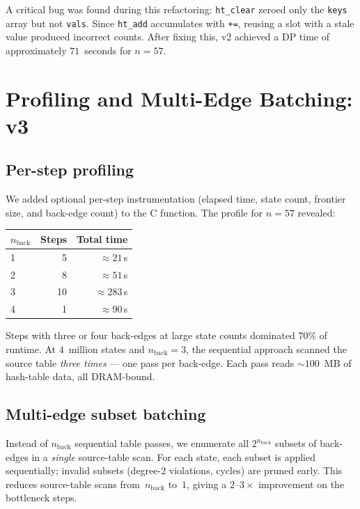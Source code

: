 \documentclass[12pt]{article}
\theoremstyle{definition}
\newcommand{\nb}{n_{\mathrm{back}}}
\begin{document}
A critical bug was found during this refactoring: \texttt{ht\_clear} zeroed
only the \texttt{keys} array but not \texttt{vals}.
Since \texttt{ht\_add} accumulates with \texttt{+=}, reusing a slot with a
stale value produced incorrect counts.
After fixing this, v2 achieved a DP time of approximately $71$~seconds for
$n = 57$.

\section{Profiling and Multi-Edge Batching: v3}
\label{sec:v3}

\subsection{Per-step profiling}

We added optional per-step instrumentation (elapsed time, state count,
frontier size, and back-edge count) to the C function.
The profile for $n = 57$ revealed:

\begin{center}
\begin{tabular}{lrr}
\toprule
$\nb$ & Steps & Total time\\
\midrule
1 & 5 & $\approx 21$\,s\\
2 & 8 & $\approx 51$\,s\\
3 & 10 & $\approx 283$\,s\\
4 & 1 & $\approx 90$\,s\\
\bottomrule
\end{tabular}
\end{center}

Steps with three or four back-edges at large state counts dominated $70\%$
of runtime.
At $4$~million states and $\nb = 3$, the sequential approach scanned the
source table \emph{three times} — one pass per back-edge.
Each pass reads $\sim\!100$~MB of hash-table data, all DRAM-bound.

\subsection{Multi-edge subset batching}

Instead of $\nb$ sequential table passes, we enumerate all $2^{\nb}$ subsets
of back-edges in a \emph{single} source-table scan.
For each state, each subset is applied sequentially; invalid subsets (degree-2
violations, cycles) are pruned early.
This reduces source-table scans from~$\nb$ to~$1$, giving a $2$--$3\times$
improvement on the bottleneck steps.
\end{document}
